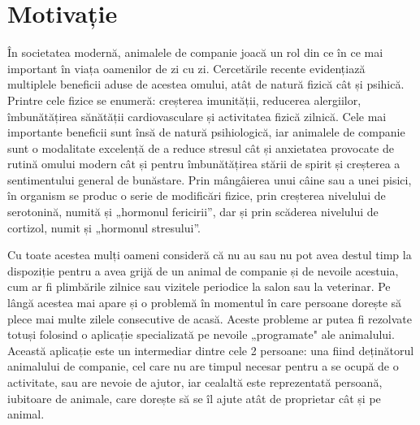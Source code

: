 \chapter*{Motivație} 

În societatea modernă, animalele de companie joacă un rol din ce în ce mai important în viața oamenilor de zi cu zi. Cercetările recente evidențiază multiplele beneficii aduse de acestea omului, atât de natură fizică cât și psihică\cite{pets_importance}. Printre cele fizice se enumeră: creșterea imunității, reducerea alergiilor, îmbunătățirea sănătății cardiovasculare și activitatea fizică zilnică. Cele mai importante beneficii sunt însă de natură psihiologică, iar animalele de companie sunt o modalitate excelență de a reduce stresul cât și anxietatea provocate de rutină omului modern cât și pentru îmbunătățirea stării de spirit și creșterea a sentimentului general de bunăstare. Prin mângâierea unui câine sau a unei pisici, în organism se produc o serie de modificări fizice, prin creșterea nivelului de serotonină, numită și „hormonul fericirii”, dar și prin scăderea nivelului de cortizol, numit și „hormonul stresului”.

Cu toate acestea mulți oameni consideră că nu au sau nu pot avea destul timp la dispoziție pentru a avea grijă de un animal de companie și de nevoile acestuia, cum ar fi plimbările zilnice sau vizitele periodice la salon sau la veterinar. Pe lângă acestea mai apare și o problemă în momentul în care persoane dorește să plece mai multe zilele consecutive de acasă. Aceste probleme ar putea fi rezolvate totuși folosind o aplicație specializată pe nevoile „programate" ale animalului. Această aplicație este un intermediar dintre cele 2 persoane: una fiind deținătorul animalului de companie, cel care nu are timpul necesar pentru a se ocupă de o activitate, sau are nevoie de ajutor, iar cealaltă este reprezentată persoană, iubitoare de animale, care dorește să se îl ajute atât de proprietar cât și pe animal.

